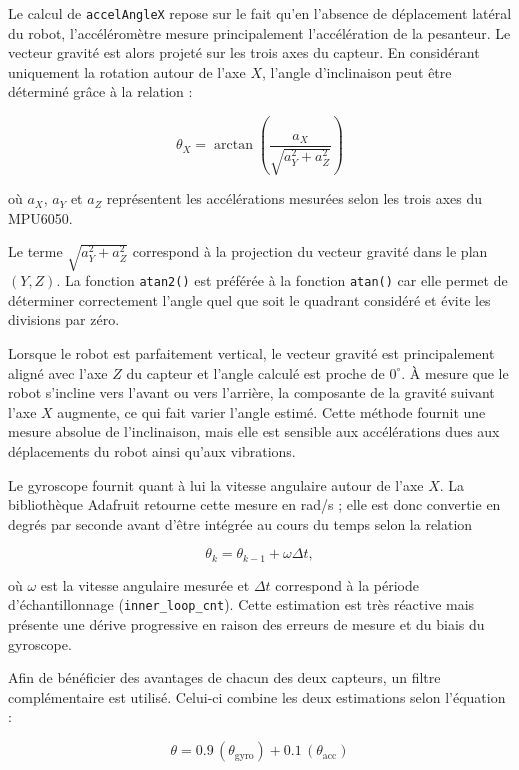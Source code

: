 Le calcul de \texttt{accelAngleX} repose sur le fait qu'en l'absence de déplacement latéral du robot, l'accéléromètre mesure principalement l'accélération de la pesanteur. Le vecteur gravité est alors projeté sur les trois axes du capteur. En considérant uniquement la rotation autour de l'axe $X$, l'angle d'inclinaison peut être déterminé grâce à la relation :

\begin{equation}
    \theta_X = \arctan\left(\frac{a_X}{\sqrt{a_Y^2+a_Z^2}}\right)
\end{equation}

où $a_X$, $a_Y$ et $a_Z$ représentent les accélérations mesurées selon les trois axes du MPU6050.

Le terme $\sqrt{a_Y^2+a_Z^2}$ correspond à la projection du vecteur gravité dans le plan $(Y,Z)$. La fonction \texttt{atan2()} est préférée à la fonction \texttt{atan()} car elle permet de déterminer correctement l'angle quel que soit le quadrant considéré et évite les divisions par zéro.

Lorsque le robot est parfaitement vertical, le vecteur gravité est principalement aligné avec l'axe $Z$ du capteur et l'angle calculé est proche de $0^\circ$. À mesure que le robot s'incline vers l'avant ou vers l'arrière, la composante de la gravité suivant l'axe $X$ augmente, ce qui fait varier l'angle estimé. Cette méthode fournit une mesure absolue de l'inclinaison, mais elle est sensible aux accélérations dues aux déplacements du robot ainsi qu'aux vibrations.

Le gyroscope fournit quant à lui la vitesse angulaire autour de l'axe $X$. La bibliothèque Adafruit retourne cette mesure en rad/s ; elle est donc convertie en degrés par seconde avant d'être intégrée au cours du temps selon la relation

\begin{equation}
    \theta_k = \theta_{k-1} + \omega \Delta t,
\end{equation}


où $\omega$ est la vitesse angulaire mesurée et $\Delta t$ correspond à la période d'échantillonnage (\texttt{inner\_loop\_cnt}). Cette estimation est très réactive mais présente une dérive progressive en raison des erreurs de mesure et du biais du gyroscope.

Afin de bénéficier des avantages de chacun des deux capteurs, un filtre complémentaire est utilisé. Celui-ci combine les deux estimations selon l'équation :


\begin{equation}
    \theta = 0.9\,(\theta_{\mathrm{gyro}}) + 0.1\,(\theta_{\mathrm{acc}})
\end{equation}


